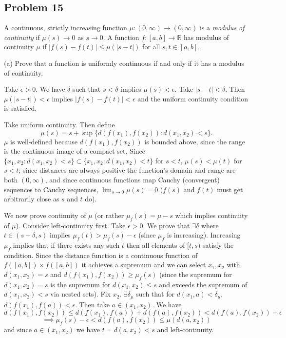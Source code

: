 \documentclass{amsart}
\begin{document}
\newpage

\subsection*{Problem 15} A continuous, strictly increasing function \( \mu : (0, \infty) \to (0, \infty) \) is a \textit{modulus of continuity} if \( \mu(s) \to 0 \) as \( s \to 0 \). A function \( f : [a, b] \to \mathbb{R} \) has modulus of continuity \( \mu \) if \( |f(s) - f(t)| \leq \mu(|s - t|) \) for all \( s, t \in [a, b] \).

(a) Prove that a function is uniformly continuous if and only if it has a modulus of continuity.

\medskip \noindent Take $\epsilon>0$. We have $\delta$ such that $s<\delta$ implies $\mu(s)<\epsilon$. Take
$|s-t|<\delta$. Then $\mu(|s-t|)<\epsilon$ implies $|f(s)-f(t)|<\epsilon$ and the uniform continuity condition is satisfied.

\medskip \noindent Take uniform continuity. Then define \[\mu(s) = s+\sup\{d(f(x_1), f(x_2)) : d(x_1, x_2)<s\}.\] $\mu$ is well-defined
because $d(f(x_1), f(x_2))$ is bounded above, since the range is the continuous image of a compact set. Since 
$\{x_1, x_2: d(x_1,x_2)<s\}\subset \{x_1, x_2: d(x_1, x_2)<t\}$ for $s<t$, $\mu(s)<\mu(t)$ for $s<t$; since distances
are always positive the function's domain and range are both $(0, \infty)$, and since continuous functions
map Cauchy (convergent) sequences to Cauchy sequences, $\lim_{s\to 0} \mu(s) = 0$ ($f(s)$ and $f(t)$ must get arbitrarily
close as $s$ and $t$ do).

\medskip \noindent We now prove continuity of $\mu$ (or rather $\mu_f(s)=\mu-s$ which implies continuity of $\mu$). Consider left-continuity first. Take $\epsilon>0$. 
We prove that $\exists \delta$ where $t\in (s-\delta, s)$ implies $\mu_f(t)>\mu_f(s)-\epsilon$ (since $\mu_f$ is increasing). Increasing
$\mu_f$ implies that if there exists any such $t$ then all elements of $[t, s)$ satisfy the condition. Since the distance function is a continuous
function of $f([a,b])\times f([a,b])$ it achieves a supremum and we can select $x_1, x_2$ with $d(x_1, x_2)=s$ and $d(f(x_1), f(x_2))\geq\mu_f(s)$ 
(since the supremum for $d(x_1, x_2)=s$ is the supremum for $d(x_1, x_2)\leq s$ and exceeds the supremum of $d(x_1, x_2)<s$ via nested sets). Fix $x_2$. 
$\exists \delta_{\mu}$ such that for $d(x_1, a)<\delta_{\mu}$, $d(f(x_1), f(a))<\epsilon$. Then take $a\in (x_1, x_2)$. We have
\[d(f(x_1), f(x_2))\leq d(f(x_1), f(a))+d(f(a), f(x_2))<d(f(a), f(x_2))+\epsilon\]
\[\implies \mu_f(s)-\epsilon<d(f(a), f(x_2))\leq \mu(d(a, x_2))\] and since $a\in (x_1, x_2)$ we have $t=d(a, x_2)<s$ and left-continuity.
\end{document}
